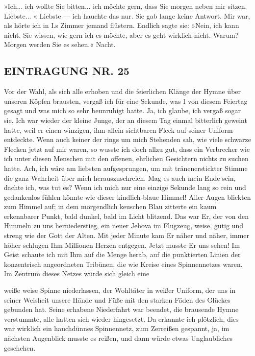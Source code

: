 »Ich... ich wollte Sie bitten... ich möchte gern, dass Sie morgen
neben mir sitzen. Liebste... « Liebste — ich hauchte das nur. Sie
gab lange keine Antwort. Mir war, als hörte ich in I.s Zimmer
jemand flüstern. Endlich sagte sie: »Nein, ich kann nicht. Sie
wissen, wie gern ich es möchte, aber es geht wirklich nicht. Warum?
Morgen werden Sie es sehen.« Nacht.

\subsection{EINTRAGUNG NR. 25}

Vor der Wahl, als sich alle erhoben und die feierlichen Klänge der
Hymne über unseren Köpfen brausten, vergaß ich für eine Sekunde,
was I von diesem Feiertag gesagt und was mich so sehr beunruhigt
hatte. Ja, ich glaube, ich vergaß sogar sie. Ich war wieder der
kleine Junge, der an diesem Tag einmal bitterlich geweint hatte,
weil er einen winzigen, ihm allein sichtbaren Fleck auf seiner
Uniform entdeckte. Wenn auch keiner der rings um mich Stehenden
sah, wie viele schwarze Flecken jetzt auf mir waren, so wusste ich
doch allzu gut, dass ein Verbrecher wie ich unter diesen Menschen
mit den offenen, ehrlichen Gesichtern nichts zu suchen hatte. Ach,
ich wäre am liebsten aufgesprungen, um mit tränenerstickter Stimme
die ganz Wahrheit über mich herauszuschreien. Mag es auch mein Ende
sein, dachte ich, was tut es? Wenn ich mich nur eine einzige
Sekunde lang so rein und gedankenlos fühlen könnte wie dieser
kindlich-blaue Himmel! Aller Augen blickten zum Himmel auf; in dem
morgendlich keuschen Blau zitterte ein kaum erkennbarer Punkt, bald
dunkel, bald im Licht blitzend. Das war Er, der von den Himmeln zu
uns herniederstieg, ein neuer Jehova im Flugzeug, weise, gütig und
streng wie der Gott der Alten. Mit jeder Minute kam Er näher und
näher, immer höher schlugen Ihm Millionen Herzen entgegen. Jetzt
musste Er uns sehen! Im Geist schaute ich mit Ihm auf die Menge
herab, auf die punktierten Linien der konzentrisch angeordneten
Tribünen, die wie Kreise eines Spinnennetzes waren. Im Zentrum
dieses Netzes würde sich gleich eine

weiße weise Spinne niederlassen, der Wohltäter in weißer Uniform,
der uns in seiner Weisheit unsere Hände und Füße mit den starken
Fäden des Glückes gebunden hat. Seine erhabene Niederfahrt war
beendet, die brausende Hymne verstummte, alle hatten sich wieder
hingesetzt. Da erkannte ich plötzlich, dies war wirklich ein
hauchdünnes Spinnennetz, zum Zerreißen gespannt, ja, im nächsten
Augenblick musste es reißen, und dann würde etwas Unglaubliches
geschehen.

